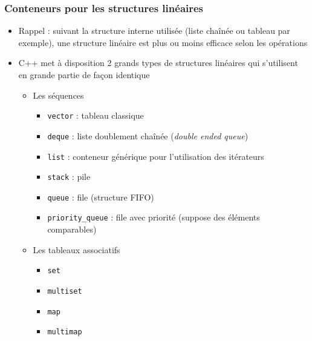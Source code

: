 \begin{frame}[fragile]\frametitle{Conteneurs pour les structures linéaires}
\begin{itemize}
\item Rappel : suivant la structure interne utilisée (liste chaînée ou tableau par exemple), une structure linéaire est plus ou moins efficace selon les opérations
\item C++ met à disposition 2 grands types de structures linéaires qui s'utilisent en grande partie de façon identique
\begin{itemize}
\item Les séquences
\begin{itemize}
\item \verb|vector|  : tableau classique
\item \verb|deque|  : liste doublement chaînée (\textit{double ended queue})
\item \verb|list|  : conteneur générique pour l'utilisation des itérateurs
\item \verb|stack|  : pile
\item \verb|queue|  : file (structure FIFO)
\item \verb|priority_queue|  : file avec priorité (suppose des éléments comparables)
\end{itemize}
\item Les tableaux associatifs
\begin{itemize}
\item \texttt{set} 
\item \texttt{multiset} 
\item \texttt{map} 
\item \texttt{multimap} 
\end{itemize}
\end{itemize}
\end{itemize}
\end{frame}

